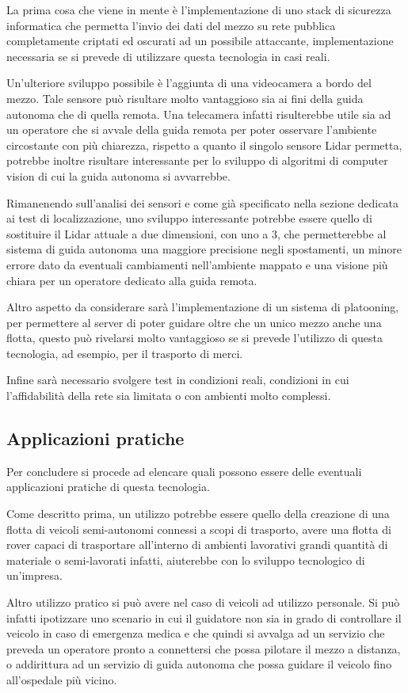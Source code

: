 \noindent La prima cosa che viene in mente è l'implementazione di uno stack di sicurezza informatica che permetta l'invio dei dati del mezzo su rete pubblica completamente criptati ed oscurati ad un possibile attaccante, implementazione necessaria se si prevede di utilizzare questa tecnologia in casi reali.

\noindent Un'ulteriore sviluppo possibile è l'aggiunta di una videocamera a bordo del mezzo. Tale sensore può risultare molto vantaggioso sia ai fini della guida autonoma che di quella remota. Una telecamera infatti risulterebbe utile sia ad un operatore che si avvale della guida remota per poter osservare l'ambiente circostante con più chiarezza, rispetto a quanto il singolo sensore Lidar permetta, potrebbe inoltre risultare interessante per lo sviluppo di algoritmi di computer vision di cui la guida autonoma si avvarrebbe. 

\noindent Rimanenendo sull'analisi dei sensori e come già specificato nella sezione dedicata ai test di localizzazione, uno sviluppo interessante potrebbe essere quello di sostituire il Lidar attuale a due dimensioni, con uno a 3, che permetterebbe al sistema di guida autonoma una maggiore precisione negli spostamenti, un minore errore dato da eventuali cambiamenti nell'ambiente mappato e una visione più chiara per un operatore dedicato alla guida remota.

\noindent Altro aspetto da considerare sarà l'implementazione di un sistema di platooning, per permettere al  server di poter guidare oltre che un unico mezzo anche una flotta, questo può rivelarsi molto vantaggioso se si prevede l'utilizzo di questa tecnologia, ad esempio, per il trasporto di merci.

\noindent Infine sarà necessario svolgere test in condizioni reali, condizioni in cui l'affidabilità della rete sia limitata o con ambienti molto complessi.

\subsection{Applicazioni pratiche}
Per concludere si procede ad elencare quali possono essere delle eventuali applicazioni pratiche di questa tecnologia.

\noindent Come descritto prima, un utilizzo potrebbe essere quello della creazione di una flotta di veicoli semi-autonomi connessi a scopi di trasporto, avere una flotta di rover capaci di trasportare all'interno di ambienti lavorativi grandi quantità di materiale o semi-lavorati infatti, aiuterebbe con lo sviluppo tecnologico di un'impresa.

\noindent Altro utilizzo pratico si può avere nel caso di veicoli ad utilizzo personale. Si può infatti ipotizzare uno scenario in cui il guidatore non sia in grado di controllare il veicolo in caso di emergenza medica e che quindi si avvalga ad un servizio che preveda un operatore pronto a connettersi che possa pilotare il mezzo a distanza, o addirittura ad un servizio di guida autonoma che possa guidare il veicolo fino all'ospedale più vicino. 
